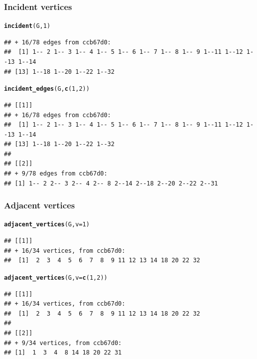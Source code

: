\documentclass[aspectratio=169]{beamer}\usepackage[]{graphicx}\usepackage[]{xcolor}
\makeatletter
\newcommand{\hlnum}[1]{\textcolor[rgb]{0.686,0.059,0.569}{#1}}%
\newcommand{\hldef}[1]{\textcolor[rgb]{0.345,0.345,0.345}{#1}}%
\newcommand{\hlkwc}[1]{\textcolor[rgb]{0.333,0.667,0.333}{#1}}%
\newcommand{\hlkwd}[1]{\textcolor[rgb]{0.737,0.353,0.396}{\textbf{#1}}}%
\newenvironment{kframe}{%
 \def\at@end@of@kframe{}%
 \ifinner\ifhmode%
  \def\at@end@of@kframe{\end{minipage}}%
  \begin{minipage}{\columnwidth}%
 \fi\fi%
 \def\FrameCommand##1{\hskip\@totalleftmargin \hskip-\fboxsep
 \colorbox{shadecolor}{##1}\hskip-\fboxsep
     \hskip-\linewidth \hskip-\@totalleftmargin \hskip\columnwidth}%
 \MakeFramed {\advance\hsize-\width
   \@totalleftmargin\z@ \linewidth\hsize
   \@setminipage}}%
 {\par\unskip\endMakeFramed%
 \at@end@of@kframe}
\newenvironment{knitrout}{}{} %
\makeatother
\begin{document}
\begin{frame}[fragile]\frametitle{Incident vertices}
\begin{knitrout}
\color{fgcolor}\begin{kframe}
\begin{alltt}
\hlkwd{incident}\hldef{(G,} \hlnum{1}\hldef{)}
\end{alltt}
\begin{verbatim}
## + 16/78 edges from ccb67d0:
##  [1] 1-- 2 1-- 3 1-- 4 1-- 5 1-- 6 1-- 7 1-- 8 1-- 9 1--11 1--12 1--13 1--14
## [13] 1--18 1--20 1--22 1--32
\end{verbatim}
\begin{alltt}
\hlkwd{incident_edges}\hldef{(G,} \hlkwd{c}\hldef{(}\hlnum{1}\hldef{,} \hlnum{2}\hldef{))}
\end{alltt}
\begin{verbatim}
## [[1]]
## + 16/78 edges from ccb67d0:
##  [1] 1-- 2 1-- 3 1-- 4 1-- 5 1-- 6 1-- 7 1-- 8 1-- 9 1--11 1--12 1--13 1--14
## [13] 1--18 1--20 1--22 1--32
## 
## [[2]]
## + 9/78 edges from ccb67d0:
## [1] 1-- 2 2-- 3 2-- 4 2-- 8 2--14 2--18 2--20 2--22 2--31
\end{verbatim}
\end{kframe}
\end{knitrout}
\end{frame}

\begin{frame}[fragile]\frametitle{Adjacent vertices}
\begin{knitrout}
\color{fgcolor}\begin{kframe}
\begin{alltt}
\hlkwd{adjacent_vertices}\hldef{(G,} \hlkwc{v} \hldef{=} \hlnum{1}\hldef{)}
\end{alltt}
\begin{verbatim}
## [[1]]
## + 16/34 vertices, from ccb67d0:
##  [1]  2  3  4  5  6  7  8  9 11 12 13 14 18 20 22 32
\end{verbatim}
\begin{alltt}
\hlkwd{adjacent_vertices}\hldef{(G,} \hlkwc{v} \hldef{=} \hlkwd{c}\hldef{(}\hlnum{1}\hldef{,} \hlnum{2}\hldef{))}
\end{alltt}
\begin{verbatim}
## [[1]]
## + 16/34 vertices, from ccb67d0:
##  [1]  2  3  4  5  6  7  8  9 11 12 13 14 18 20 22 32
## 
## [[2]]
## + 9/34 vertices, from ccb67d0:
## [1]  1  3  4  8 14 18 20 22 31
\end{verbatim}
\end{kframe}
\end{knitrout}
\end{frame}
\end{document}

